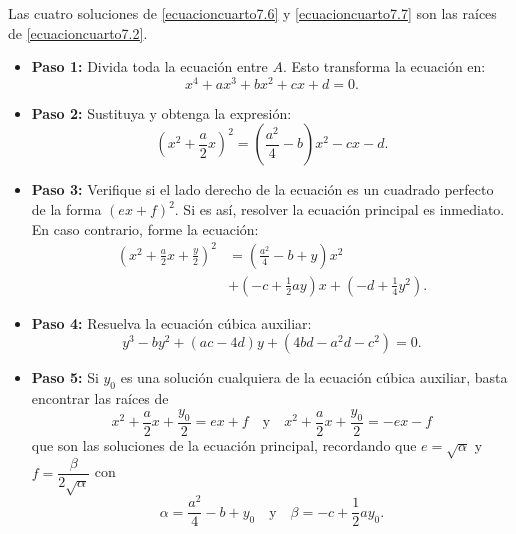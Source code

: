 Las cuatro soluciones de \eqref{ecuacioncuarto7.6} y \eqref{ecuacioncuarto7.7} son las raíces de \eqref{ecuacioncuarto7.2}.

\newpage\noindent

\begin{adjustwidth}{-7.6cm}{-2cm}
    \begin{tcolorbox}[
        theorem style=change break,
        enhanced,
        breakable,
        boxrule=0pt,
        frame hidden,
        left = 1.8cm,
        right = 1.8cm,
        top=4mm,
        bottom=6mm,
        colback=black!7!white,
        coltitle=black,
        attach title to upper={\ },
        sharp corners,
        borderline north={1.5pt}{0pt}{black},
        title = {Algoritmo para resolver una ecuación de cuarto grado:},
        fonttitle=\selectfont\Lato\bfseries\LARGE,
        fontupper=\normalsize
    ]
        \begin{multicols}{2}
            \begin{itemize}
                \item \textbf{Paso 1:} Divida toda la ecuación entre $A$. Esto transforma la ecuación en:
                $$x^4 + ax^3 + bx^2 + cx + d = 0.$$
                \item \textbf{Paso 2:} Sustituya y obtenga la expresión:
                $$\left( x^2 + \frac{a}{2}x \right)^2 = \left( \frac{a^2}{4} - b \right) x^2 - cx - d.$$
                \item \textbf{Paso 3:} Verifique si el lado derecho de la ecuación es un cuadrado perfecto de la forma $(ex + f)^2$. Si es así, resolver la ecuación principal es inmediato. En caso contrario, forme la ecuación:
                \begin{align*}
                    \left( x^2 + \frac{a}{2}x + \frac{y}{2} \right)^2 & = \left( \frac{a^2}{4} - b + y \right) x^2 \\
                    & + \left(- c + \frac{1}{2} ay \right) x + \left(- d + \frac{1}{4} y^2 \right).
                \end{align*}
                \item \textbf{Paso 4:} Resuelva la ecuación cúbica auxiliar:
                $$y^3 - by^2 + (ac - 4d)y + \left(4bd - a^2d - c^2\right) = 0.$$
                \item \textbf{Paso 5:} Si $y_0$ es una solución cualquiera de la ecuación cúbica auxiliar, basta encontrar las raíces de
                $$x^2 + \frac{a}{2}x + \frac{y_0}{2} = ex + f \quad \text{y} \quad x^2 + \frac{a}{2}x + \frac{y_0}{2} = -ex - f$$
                que son las soluciones de la ecuación principal, recordando que $e = \sqrt{\alpha}$ y $f = \dfrac{\beta}{2\sqrt{\alpha}}$ con
                $$\alpha = \frac{a^2}{4} - b + y_0 \quad \text{y} \quad \beta = - c + \frac{1}{2} ay_0.$$
            \end{itemize}
        \end{multicols}
    \end{tcolorbox}
\end{adjustwidth}

